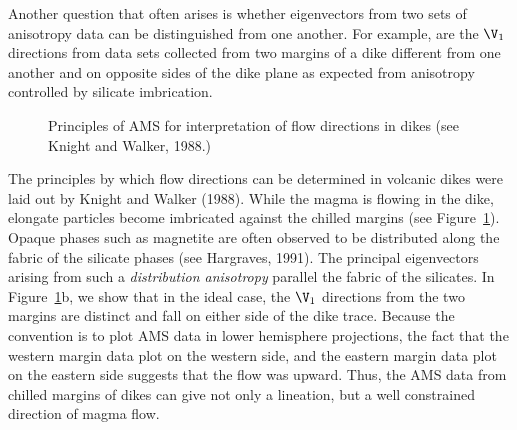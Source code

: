 Another question that often arises is whether eigenvectors from  
two sets of anisotropy data can be 
distinguished from one another. For example, are the $\V_1$ directions from data sets
collected from two margins of a dike different from one another and on opposite
sides of the dike plane as expected from anisotropy controlled by silicate
imbrication.  



\begin{figure}[htb]
\epsfxsize 12cm
\centering {}
\caption{Principles of AMS for interpretation of flow directions in dikes (see
Knight and Walker, 1988.)}
\label{fig:dikeams}
\end{figure} \nocite{knight88} 

The principles by which flow directions can be determined in volcanic dikes
were laid out by  
Knight and Walker (1988). \nocite{knight88} 
While the magma is flowing in the
dike, elongate particles 
 become imbricated against the chilled margins (see Figure~\ref{fig:dikeams}).
Opaque phases such as magnetite are often observed to be 
distributed along the fabric of 
the silicate phases (see 
 Hargraves, 1991).\nocite{hargraves91} 
The principal eigenvectors arising from such a
{\it distribution anisotropy} parallel the  fabric of the silicates.
 In Figure~\ref{fig:dikeams}b,
we show that in the ideal case,
the $\V_1$ directions from the two margins are distinct and 
fall on either side of the dike trace.  Because the convention is to plot AMS
data in lower hemisphere projections, the fact that the western margin data
plot on the western side, and the eastern margin data plot on the eastern side
suggests that the flow was upward.  Thus, the AMS data from 
chilled margins of dikes can give not only a lineation, but a well constrained
direction of magma flow. 


